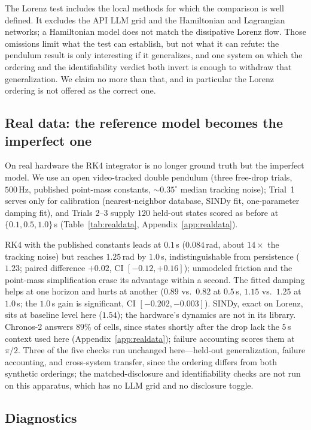 \documentclass{article}
\begin{document}
The Lorenz test includes the local methods for which the comparison is well defined. It excludes
the API LLM grid and the Hamiltonian and Lagrangian networks; a Hamiltonian model does not match
the dissipative Lorenz flow. Those omissions limit what the test can establish, but not what it
can refute: the pendulum result is only interesting if it generalizes, and one system on which
the ordering and the identifiability verdict both invert is enough to withdraw that
generalization. We claim no more than that, and in particular the Lorenz ordering is not offered
as the correct one.

\subsection{Real data: the reference model becomes the imperfect one}
\label{sec:realdata}
On real hardware the RK4 integrator is no longer ground truth but the imperfect model. We use
an open video-tracked double pendulum
\citep{myers2020pendulum} (three free-drop trials, $500$\,Hz, published point-mass constants,
${\sim}0.35^{\circ}$ median tracking noise); Trial~1 serves only for calibration (nearest-neighbor
database, SINDy fit, one-parameter damping fit), and Trials 2--3 supply $120$ held-out states
scored as before at $\{0.1,0.5,1.0\}$\,s (Table~\ref{tab:realdata},
Appendix~\ref{app:realdata}).

RK4 with the published constants leads at $0.1$\,s ($0.084$\,rad, about $14\times$ the
tracking noise) but reaches $1.25$\,rad by $1.0$\,s, indistinguishable from persistence
($1.23$; paired difference $+0.02$, CI $[-0.12,+0.16]$); unmodeled friction and the
point-mass simplification erase its advantage within a second. The fitted damping helps at one
horizon and hurts at another ($0.89$ vs.\ $0.82$ at $0.5$\,s, $1.15$ vs.\ $1.25$ at
$1.0$\,s; the $1.0$\,s gain is significant, CI $[-0.202,-0.003]$). SINDy, exact on Lorenz, sits at baseline level here
($1.54$); the hardware's dynamics are not in its library. Chronos-2 answers $89\%$ of cells,
since states shortly after the drop lack the $5$\,s context used here
(Appendix~\ref{app:realdata}); failure accounting scores them at $\pi/2$. Three of the five
checks run unchanged here---held-out generalization, failure accounting, and cross-system
transfer, since the ordering differs from both synthetic orderings; the matched-disclosure and
identifiability checks are not run on this apparatus, which has no LLM grid and no disclosure
toggle.

\subsection{Diagnostics}
\label{sec:behavior}
\end{document}
